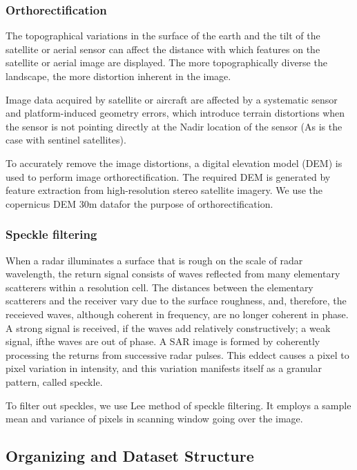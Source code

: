\subsubsection{Orthorectification}

The topographical variations in the surface of the earth and the tilt of the satellite or aerial sensor can affect the distance with which features on the satellite or aerial image are displayed. The more topographically diverse the landscape, the more distortion inherent in the image.

Image data acquired by satellite or aircraft are affected by a systematic sensor and platform-induced geometry errors, which introduce terrain distortions when the sensor is not pointing directly at the Nadir location of the sensor (As is the case with sentinel satellites).

To accurately remove the image distortions, a digital elevation model (DEM) is used to perform image orthorectification. The required DEM is generated by feature extraction from high-resolution stereo satellite imagery. We use the copernicus DEM 30m datafor the purpose of orthorectification.

\subsubsection{Speckle filtering}

When a radar illuminates a surface that is rough on the scale of radar wavelength, the return signal consists of waves reflected from many elementary scatterers within a resolution cell. The distances between the elementary scatterers and the receiver vary due to the surface roughness, and, therefore, the receieved waves, although coherent in frequency, are no longer coherent in phase. A strong signal is received, if the waves add relatively constructively; a weak signal, ifthe waves are out of phase. A SAR image is formed by coherently processing the returns from successive radar pulses. This eddect causes a pixel to pixel variation in intensity, and this variation manifests itself as a granular pattern, called speckle\cite{SpeckleLee}.

To filter out speckles, we use Lee method of speckle filtering. It employs a sample mean and variance of pixels in scanning window going over the image.

\subsection{Organizing and Dataset Structure}

